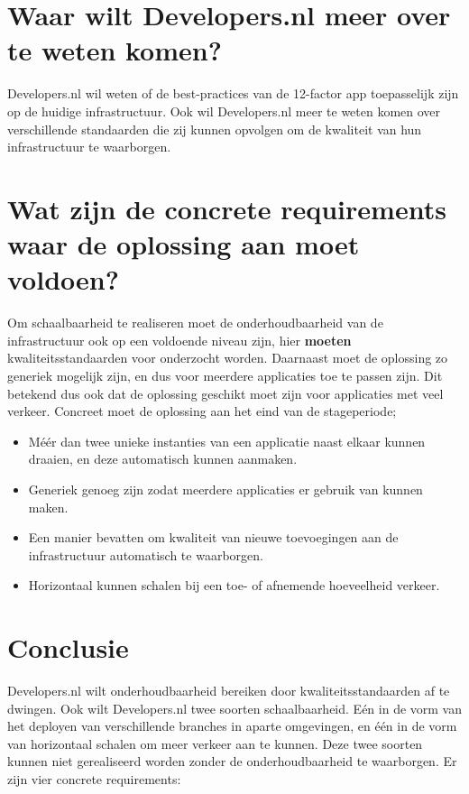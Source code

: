 \section{Waar wilt Developers.nl meer over te weten komen?}

Developers.nl wil weten of de best-practices van de 12-factor app toepasselijk zijn op de huidige infrastructuur. Ook wil Developers.nl meer te weten komen over verschillende standaarden die zij kunnen opvolgen om de kwaliteit van hun infrastructuur te waarborgen.

\section{Wat zijn de concrete requirements waar de oplossing aan moet voldoen?}

Om schaalbaarheid te realiseren moet de onderhoudbaarheid van de infrastructuur ook op een voldoende niveau zijn, hier \textbf{moeten} kwaliteitsstandaarden voor onderzocht worden. Daarnaast moet de oplossing zo generiek mogelijk zijn, en dus voor meerdere applicaties toe te passen zijn. Dit betekend dus ook dat de oplossing geschikt moet zijn voor applicaties met veel verkeer. Concreet moet de oplossing aan het eind van de stageperiode;

\begin{itemize}
	\item Méér dan twee unieke instanties van een applicatie naast elkaar kunnen draaien, en deze automatisch kunnen aanmaken.
	\item Generiek genoeg zijn zodat meerdere applicaties er gebruik van kunnen maken.
	\item Een manier bevatten om kwaliteit van nieuwe toevoegingen aan de infrastructuur automatisch te waarborgen.
	\item Horizontaal kunnen schalen bij een toe- of afnemende hoeveelheid verkeer.
\end{itemize}

\section{Conclusie}

Developers.nl wilt onderhoudbaarheid bereiken door kwaliteitsstandaarden af te dwingen. Ook wilt Developers.nl twee soorten schaalbaarheid. Eén in de vorm van het deployen van verschillende branches in aparte omgevingen, en één in de vorm van horizontaal schalen om meer verkeer aan te kunnen. Deze twee soorten kunnen niet gerealiseerd worden zonder de onderhoudbaarheid te waarborgen. Er zijn vier concrete requirements:


